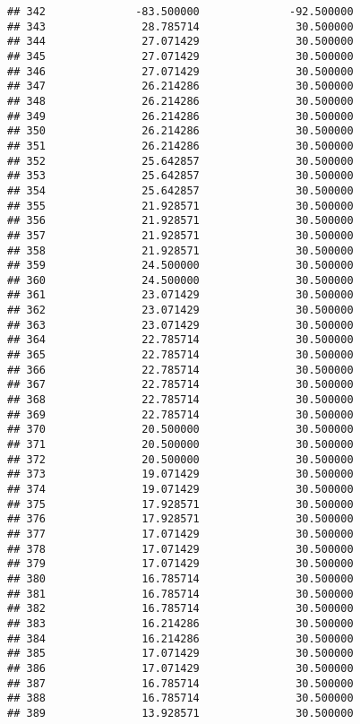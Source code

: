 \documentclass[]{article}
\begin{document}
\begin{verbatim}
## 342              -83.500000              -92.500000
## 343               28.785714               30.500000
## 344               27.071429               30.500000
## 345               27.071429               30.500000
## 346               27.071429               30.500000
## 347               26.214286               30.500000
## 348               26.214286               30.500000
## 349               26.214286               30.500000
## 350               26.214286               30.500000
## 351               26.214286               30.500000
## 352               25.642857               30.500000
## 353               25.642857               30.500000
## 354               25.642857               30.500000
## 355               21.928571               30.500000
## 356               21.928571               30.500000
## 357               21.928571               30.500000
## 358               21.928571               30.500000
## 359               24.500000               30.500000
## 360               24.500000               30.500000
## 361               23.071429               30.500000
## 362               23.071429               30.500000
## 363               23.071429               30.500000
## 364               22.785714               30.500000
## 365               22.785714               30.500000
## 366               22.785714               30.500000
## 367               22.785714               30.500000
## 368               22.785714               30.500000
## 369               22.785714               30.500000
## 370               20.500000               30.500000
## 371               20.500000               30.500000
## 372               20.500000               30.500000
## 373               19.071429               30.500000
## 374               19.071429               30.500000
## 375               17.928571               30.500000
## 376               17.928571               30.500000
## 377               17.071429               30.500000
## 378               17.071429               30.500000
## 379               17.071429               30.500000
## 380               16.785714               30.500000
## 381               16.785714               30.500000
## 382               16.785714               30.500000
## 383               16.214286               30.500000
## 384               16.214286               30.500000
## 385               17.071429               30.500000
## 386               17.071429               30.500000
## 387               16.785714               30.500000
## 388               16.785714               30.500000
## 389               13.928571               30.500000

\end{verbatim}
\end{document}
